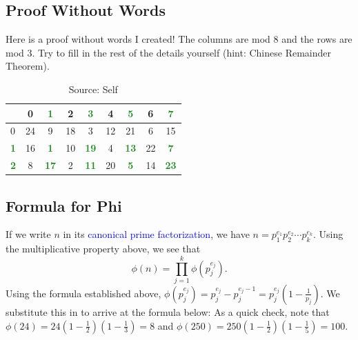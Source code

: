 \subsection{Proof Without Words}
Here is a proof without words I created! The columns are mod $8$ and the rows are mod $3$. Try to fill in the rest of the details yourself (hint: Chinese Remainder Theorem).
\begin{table}[h]
	\centering
	\begin{tabular}{l | c c c c c c c c|}
		\toprule
		& 0 & \textbf{\textcolor{ForestGreen}{1}} & 2 & \textbf{\textcolor{ForestGreen}{3}} & 4 & \textbf{\textcolor{ForestGreen}{5}} & 6 & \textbf{\textcolor{ForestGreen}{7}} \\
		\midrule
		0 & 24 & 9 & 18 & 3 & 12 & 21 & 6 & 15 \\
		\textbf{\textcolor{ForestGreen}{1}} & 16 & \textbf{\textcolor{ForestGreen}{1}} & 10 & \textbf{\textcolor{ForestGreen}{19}} & 4 & \textbf{\textcolor{ForestGreen}{13}} & 22 & \textbf{\textcolor{ForestGreen}{7}} \\
		\textbf{\textcolor{ForestGreen}{2}} & 8 & \textbf{\textcolor{ForestGreen}{17}} & 2 & \textbf{\textcolor{ForestGreen}{11}} & 20 & \textbf{\textcolor{ForestGreen}{5}} & 14 & \textbf{\textcolor{ForestGreen}{23}} \\

		\bottomrule
	\end{tabular}
	\caption{Source: Self}
\end{table}
\subsection{Formula for Phi}
If we write $n$ in its \textcolor{blue}{canonical prime factorization}, we have $n=\displaystyle p_1^{e_1}p_2^{e_2}\cdots p_k^{e_k}$. Using the multiplicative property above, we see that $$\phi(n)=\prod_{j=1}^{k}\phi\left(p_j^{e_j}\right).$$
Using the formula established above, $\phi(p_j^{e_j})=p_j^{e_j}-p_j^{e_j-1}=p_j^{e_j}\left(1-\frac{1}{p_j}\right)$. We substitute this in to arrive at the formula below:
\vspace{5pt}
As a quick check, note that $\phi(24)=24\left(1-\frac12\right)\left(1-\frac13\right)=8$ and $\phi(250)=250\left(1-\frac12\right)\left(1-\frac15\right)=100$. 

